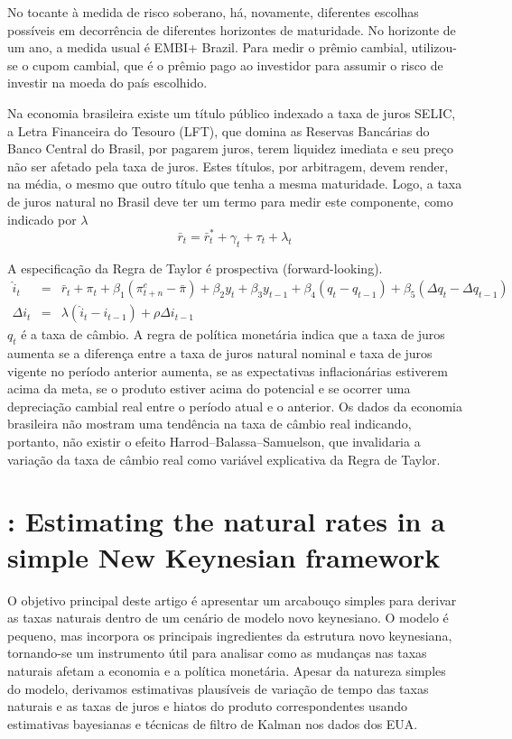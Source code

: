 \documentclass[11pt,oneside,a4paper]{article}
\begin{document}
No tocante à medida de risco soberano, há, novamente, diferentes escolhas possíveis em decorrência de diferentes horizontes de maturidade. No horizonte de um ano, a medida usual é EMBI+ Brazil. Para medir o prêmio cambial, utilizou-se o cupom cambial, que é o prêmio pago ao investidor para assumir o risco de investir na moeda do país escolhido. 

Na economia brasileira existe um título público indexado a taxa de juros SELIC, a Letra Financeira do Tesouro (LFT), que domina as Reservas Bancárias do Banco Central do Brasil, por pagarem juros, terem liquidez imediata e seu preço não ser afetado pela taxa de juros. Estes títulos, por arbitragem, devem render, na média, o mesmo que outro título que tenha a mesma maturidade. Logo, a taxa de juros natural no Brasil deve ter um termo para medir este componente, como indicado por $\lambda$
\begin{equation}
    \bar{r}_t = \bar{r}_t^{*} + \gamma_t + \tau_t + \lambda_t
\end{equation}

A especificação da Regra de Taylor é prospectiva (forward-looking).
\begin{eqnarray}
    \hat{i}_t &=& \bar{r}_t + \pi_t + \beta_1 (\pi_{t+n}^{e} - \bar{\pi} ) + \beta_2 y_t + \beta_3 y_{t-1} + \beta_4 (q_t - q_{t-1}) + \beta_5 (\Delta q_t -  \Delta q_{t-1}) \\
    \Delta i_t &=& \lambda(\hat{i}_t - i_{t-1}) + \rho \Delta i_{t-1}
\end{eqnarray}
$q_t$ é a taxa de câmbio. A regra de política monetária indica que a taxa de juros aumenta se a diferença entre a taxa de juros natural nominal e taxa de juros vigente no período anterior aumenta, se as expectativas inflacionárias estiverem acima da meta, se o produto estiver acima do potencial e se ocorrer uma depreciação cambial real entre o período atual e o anterior. Os dados da economia brasileira não mostram uma tendência na taxa de câmbio real indicando, portanto, não existir o efeito Harrod–Balassa–Samuelson, que invalidaria a variação da taxa de câmbio real como variável explicativa da Regra de Taylor.
%
%
\section{\citet{Bjornland:2011}: Estimating the natural rates in a simple New Keynesian framework  }

O objetivo principal deste artigo é apresentar um arcabouço simples para derivar as taxas naturais dentro de um cenário de modelo novo keynesiano. O modelo é pequeno, mas incorpora os principais ingredientes da estrutura novo keynesiana, tornando-se um instrumento útil para analisar como as mudanças nas taxas naturais afetam a economia e a política monetária. Apesar da natureza simples do modelo, derivamos estimativas plausíveis de variação de tempo das taxas naturais e as taxas de juros e hiatos do produto correspondentes usando estimativas bayesianas e técnicas de filtro de Kalman nos dados dos EUA.
\end{document}
